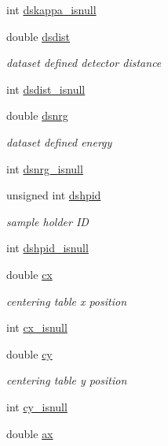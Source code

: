 \begin{DoxyCompactItemize}
int \hyperlink{structlspg__nextshot__struct_a1686a72509cc1c3383ee95a790ddff14}{dskappa\-\_\-isnull}
\item 
double \hyperlink{structlspg__nextshot__struct_acab9431a911f5bb11296cbfb271fb83a}{dsdist}
\begin{DoxyCompactList}\small\item\em dataset defined detector distance \end{DoxyCompactList}\item 
int \hyperlink{structlspg__nextshot__struct_ac6f2bdc7b023d933509bf74af7b169f9}{dsdist\-\_\-isnull}
\item 
double \hyperlink{structlspg__nextshot__struct_a371e574055fec7660b8f2e637eaf9f25}{dsnrg}
\begin{DoxyCompactList}\small\item\em dataset defined energy \end{DoxyCompactList}\item 
int \hyperlink{structlspg__nextshot__struct_ad14d8bb50290ec12e58f4aaec5cc5aab}{dsnrg\-\_\-isnull}
\item 
unsigned int \hyperlink{structlspg__nextshot__struct_a5e260a420176f2973cdb100d0a5c4c09}{dshpid}
\begin{DoxyCompactList}\small\item\em sample holder I\-D \end{DoxyCompactList}\item 
int \hyperlink{structlspg__nextshot__struct_afe16be0382423aa3f25cb3d6cf99430b}{dshpid\-\_\-isnull}
\item 
double \hyperlink{structlspg__nextshot__struct_ad9eb2013fa6f295f72f0891fe98c863f}{cx}
\begin{DoxyCompactList}\small\item\em centering table x position \end{DoxyCompactList}\item 
int \hyperlink{structlspg__nextshot__struct_a779b99533f0ed4e659177afb0b791ad2}{cx\-\_\-isnull}
\item 
double \hyperlink{structlspg__nextshot__struct_ab7a7b37a17f06c4e9ebdcdf056946098}{cy}
\begin{DoxyCompactList}\small\item\em centering table y position \end{DoxyCompactList}\item 
int \hyperlink{structlspg__nextshot__struct_a3895d645420848aed05b95694ec8c6c7}{cy\-\_\-isnull}
\item 
double \hyperlink{structlspg__nextshot__struct_a7f57874223897ab7d9c7531a9522904d}{ax}

\end{DoxyCompactItemize}
